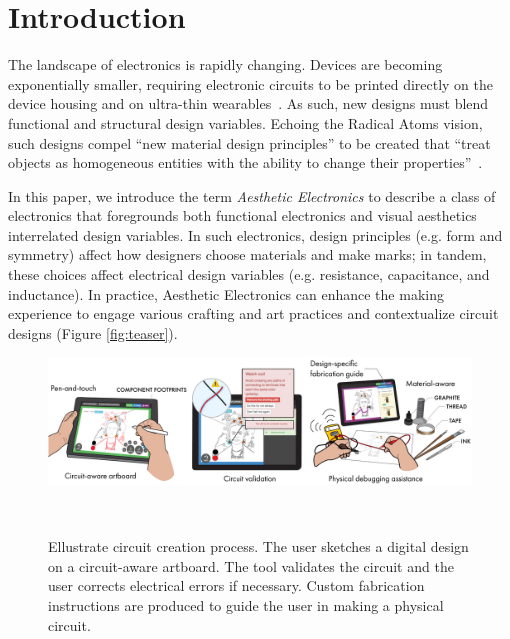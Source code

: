 \documentclass{sigchi}
\begin{document}

\section{Introduction}


The landscape of electronics is rapidly changing. Devices are becoming exponentially smaller, requiring electronic circuits to be printed directly on the device housing and on ultra-thin wearables~\cite{MacDonald:2014ju,Kim:2014iq}. As such, new designs must blend functional and structural design variables. Echoing the Radical Atoms vision, such designs compel ``new material design principles'' to be created that ``treat objects as homogeneous entities with the ability to change their properties''~\cite{Ishii:2012fg}.

In this paper, we introduce the term \textit{Aesthetic Electronics} to describe a class of electronics that foregrounds both functional electronics and visual aesthetics interrelated design variables. In such electronics, design principles (e.g. form and symmetry) affect how designers choose materials and make marks; in tandem, these choices affect electrical design variables (e.g. resistance, capacitance, and inductance). In practice, Aesthetic Electronics can enhance the making experience to engage various crafting and art practices and contextualize circuit designs (Figure \ref{fig:teaser}).
\begin{figure}[ht]
 \vspace{-16pt}
\centering
  \includegraphics[width=\linewidth]{figures/ellustrate_system.pdf}
  \caption{Ellustrate circuit creation process. The user sketches a digital design on a circuit-aware artboard. The tool validates the circuit and the user corrects electrical errors if necessary. Custom fabrication instructions are produced to guide the user in making a physical circuit.}~\label{fig:process_flow}
  \vspace{-16pt}
\end{figure}
\end{document}
